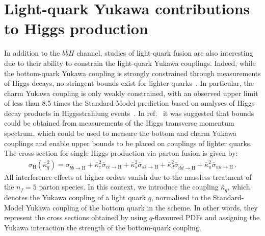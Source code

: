 \documentclass[11pt,a4paper]{article}
\begin{document}




\section{Light-quark Yukawa contributions to Higgs production}\label{sec:lightYukawa}
In addition to the $b\bar{b}H$ channel, studies of light-quark fusion are also interesting due to their ability to constrain the light-quark Yukawa couplings. Indeed, while the bottom-quark Yukawa coupling is strongly constrained through measurements of Higgs decays, no stringent bounds exist for lighter quarks~\cite{Kagan:2014ila}. In particular, the charm Yukawa coupling is only weakly constrained, with an observed upper limit of less than 8.5 times the Standard Model prediction based on analyses of Higgs decay products in Higgsstrahlung events~\cite{Atlas:2022ers}. In ref.~\cite{Bishara:2016jga} it was suggested that bounds could be obtained from measurements of the Higgs transverse momentum spectrum, which could be used to measure the bottom and charm Yukawa couplings and  enable upper bounds to be placed on couplings of lighter quarks. The cross-section for single Higgs production via parton fusion is given by:
\begin{align}
\sigma_{\text{H}}(\bar \kappa_q^2)=\sigma_{b\bar b \rightarrow \text{H}}+\bar \kappa_c^2 \bar \sigma_{c\bar c \rightarrow \text{H}}+\bar \kappa_s^2 \bar \sigma_{s\bar s \rightarrow \text{H}}+\bar \kappa_d^2 \bar \sigma_{d\bar d \rightarrow \text{H}}+\bar \kappa_u^2 \bar \sigma_{u\bar u \rightarrow \text{H}}\,.
\end{align}
All interference effects at higher orders vanish due to the massless treatment of the \( n_f = 5 \) parton species. In this context, we introduce the coupling \( \bar\kappa_q \), which denotes the Yukawa coupling of a light quark \( q \), normalised to the Standard-Model Yukawa coupling of the bottom quark in the \MSbar{} scheme. In other words, they represent the cross sections obtained by using \( q \)-flavoured PDFs and assigning the Yukawa interaction the strength of the bottom-quark coupling.
\end{document}
